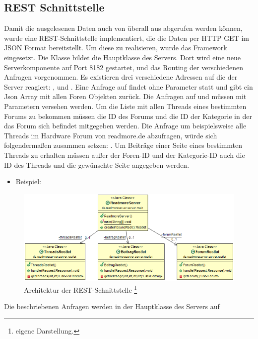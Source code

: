 \subsection{REST Schnittstelle}
Damit die ausgelesenen Daten auch von überall aus abgerufen werden können, wurde
eine REST-Schnittstelle implementiert, die die Daten per HTTP GET im
JSON Format bereitstellt. Um diese zu realisieren, wurde das Framework
 eingesetzt. Die Klasse  bildet die
Hauptklasse des Servers. Dort wird eine neue Serverkomponente auf Port 8182
gestartet, und das Routing der verschiedenen Anfragen vorgenommen. Es existieren
drei verschiedene Adressen auf die der Server reagiert: ,
 und . Eine Anfrage auf  findet ohne
Parameter statt und gibt ein Json Array mit allen Foren Objekten zurück. Die
Anfragen auf  und  müssen mit Parametern versehen
werden. Um die Liste mit allen Threads eines bestimmten Forums zu bekommen
müssen die ID des Forums und die ID der Kategorie in der das Forum sich befindet
mitgegeben werden. Die Anfrage um beispielsweise alle Threads im Hardware Forum
von readmore.de abzufragen, würde sich folgendermaßen zusammen setzen:
.
Um Beiträge einer Seite eines bestimmten Threads zu erhalten müssen außer der
Foren-ID und der Kategorie-ID auch die ID des Threads und die gewünschte Seite
angegeben werden.
\begin{itemize}
  \item Beispiel: 
\end{itemize}
\begin{figure}[!htbp]
\centering
\includegraphics[width=\textwidth]{Bilder/server.png}
\caption[Architektur der REST-Schnittstelle]{Architektur der REST-Schnittstelle \protect\footnote{eigene Darstellung.} }
\label{restuml}
\end{figure}
Die beschriebenen Anfragen werden in der Hauptklasse des Servers auf
